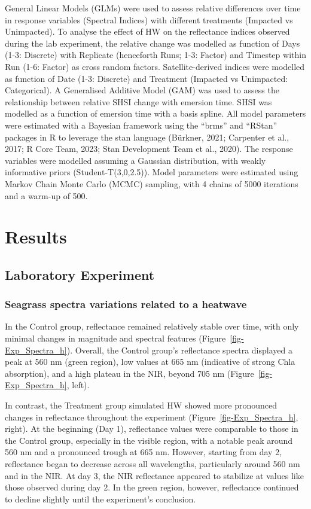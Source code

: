 \documentclass[
  letterpaper,
  11pt,
  english,
  singlespacing,
  headsepline]{MastersDoctoralThesis}
\begin{document}
\begin{spacing}{1.5}
General Linear Models (GLMs) were used to assess relative differences
over time in response variables (Spectral Indices) with different
treatments (Impacted vs Unimpacted). To analyse the effect of HW on the
reflectance indices observed during the lab experiment, the relative
change was modelled as function of Days (1-3: Discrete) with Replicate
(henceforth Runs; 1-3: Factor) and Timestep within Run (1-6: Factor) as
cross random factors. Satellite-derived indices were modelled as
function of Date (1-3: Discrete) and Treatment (Impacted vs Unimpacted:
Categorical). A Generalised Additive Model (GAM) was used to assess the
relationship between relative SHSI change with emersion time. SHSI was
modelled as a function of emersion time with a basis spline. All model
parameters were estimated with a Bayesian framework using the ``brms''
and ``RStan'' packages in R to leverage the stan language (Bürkner,
2021; Carpenter et al., 2017; R Core Team, 2023; Stan Development Team
et al., 2020). The response variables were modelled assuming a Gaussian
distribution, with weakly informative priors (Student-T(3,0,2.5)). Model
parameters were estimated using Markov Chain Monte Carlo (MCMC)
sampling, with 4 chains of 5000 iterations and a warm-up of 500.

\section{Results}\label{results-3}

\subsection{Laboratory Experiment}\label{laboratory-experiment-1}

\subsubsection{Seagrass spectra variations related to a
heatwave}\label{seagrass-spectra-variations-related-to-a-heatwave}

In the Control group, reflectance remained relatively stable over time,
with only minimal changes in magnitude and spectral features
(Figure~\ref{fig-Exp_Spectra_h}). Overall, the Control group's
reflectance spectra displayed a peak at 560 nm (green region), low
values at 665 nm (indicative of strong Chla absorption), and a high
plateau in the NIR, beyond 705 nm (Figure~\ref{fig-Exp_Spectra_h},
left).

In contrast, the Treatment group simulated HW showed more pronounced
changes in reflectance throughout the experiment
(Figure~\ref{fig-Exp_Spectra_h}, right). At the beginning (Day 1),
reflectance values were comparable to those in the Control group,
especially in the visible region, with a notable peak around 560 nm and
a pronounced trough at 665 nm. However, starting from day 2, reflectance
began to decrease across all wavelengths, particularly around 560 nm and
in the NIR. At day 3, the NIR reflectance appeared to stabilize at
values like those observed during day 2. In the green region, however,
reflectance continued to decline slightly until the experiment's
conclusion.


\end{spacing}
\end{document}
